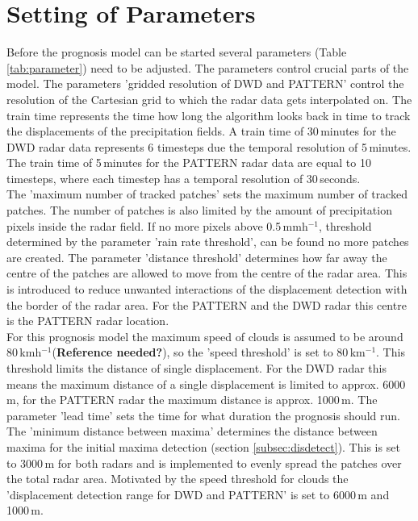 \documentclass[11pt,twoside,a4paper,fleqn,x11names]{report}
\numberwithin{equation}{chapter}
\numberwithin{figure}{chapter}
\numberwithin{table}{chapter}
\begin{document}
\section{Setting of Parameters}
\label{subsec:param}
Before the prognosis model can be started several parameters (Table \ref{tab:parameter}) need to be adjusted. The parameters control crucial parts of the model. The parameters 'gridded resolution of DWD and PATTERN' control the resolution of the Cartesian grid to which the radar data gets interpolated on. The train time represents the time how long the algorithm looks back in time to track the displacements of the precipitation fields. A train time of 30\,minutes for the DWD radar data represents 6 timesteps due the temporal resolution of 5\,minutes. The train time of 5\,minutes for the PATTERN radar data are equal to 10 timesteps, where each timestep has a temporal resolution of 30\,seconds. \\
The 'maximum number of tracked patches' sets the maximum number of tracked patches. The number of patches is also limited by the amount of precipitation pixels inside the radar field. If no more pixels above 0.5\,mmh$^{-1}$, threshold determined by the parameter 'rain rate threshold', can be found no more patches are created. The parameter 'distance threshold' determines how far away the centre of the patches are allowed to move from the centre of the radar area. This is introduced to reduce unwanted interactions of the displacement detection with the border of the radar area. For the PATTERN and the DWD radar this centre is the PATTERN radar location. \\
For this prognosis model the maximum speed of clouds is assumed to be around 80\,kmh$^{-1}$(\textbf{Reference needed?}), so the 'speed threshold' is set to 80\,km$^{-1}$. This threshold limits the distance of single displacement. For the DWD radar this means the maximum distance of a single displacement is limited to approx. 6000\,m, for the PATTERN radar the maximum distance is approx. 1000\,m. The parameter 'lead time' sets the time for what duration the prognosis should run. \\
The 'minimum distance between maxima' determines the distance between maxima for the initial maxima detection (section \ref{subsec:disdetect}). This is set to 3000\,m for both radars and is implemented to evenly spread the patches over the total radar area. Motivated by the speed threshold for clouds the 'displacement detection range for DWD and PATTERN' is set to 6000\,m and 1000\,m. \\
\end{document}
